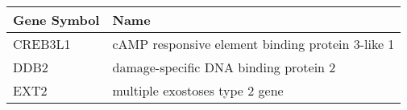 \begin{tabular}{ll}
\toprule
Gene Symbol &                                             Name \\
\midrule
    CREB3L1 & cAMP responsive element binding protein 3-like 1 \\
       DDB2 &            damage-specific DNA binding protein 2 \\
       EXT2 &                   multiple exostoses type 2 gene \\
\bottomrule
\end{tabular}
